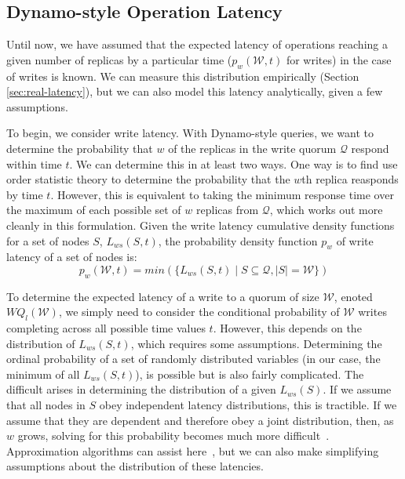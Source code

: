 \documentclass{vldb}
\begin{document}
\subsection{Dynamo-style Operation Latency}

\label{sec:dynamo-prop}

Until now, we have assumed that the expected latency of operations
reaching a given number of replicas by a particular time
($p_w(\mathcal{W}, t)$ for writes) in the case of writes is known.  We
can measure this distribution empirically (Section
\ref{sec:real-latency}), but we can also model this latency
analytically, given a few assumptions.

To begin, we consider write latency.  With Dynamo-style queries, we
want to determine the probability that $w$ of the replicas in the
write quorum $\mathcal{Q}$ respond within time $t$.  We can determine
this in at least two ways.  One way is to find use order statistic
theory to determine the probability that the $w$th replica reasponds
by time $t$.  However, this is equivalent to taking the minimum
response time over the maximum of each possible set of $w$ replicas
from $\mathcal{Q}$, which works out more cleanly in this formulation.
Given the write latency cumulative density functions for a set of
nodes $S$, $L_{ws}(S, t)$, the probability density function $p_w$ of
write latency of a set of nodes is:
\begin{equation}
p_w(\mathcal{W}, t) = min(\{L_{ws}(S, t) \mid S \subseteq \mathcal{Q}, |S| = \mathcal{W}\})
\end{equation}

To determine the expected latency of a write to a quorum of size
$\mathcal{W}$, enoted $WQ_l(\mathcal{W})$, we simply need to consider
the conditional probability of $\mathcal{W}$ writes completing across
all possible time values $t$.  However, this depends on the
distribution of $L_{ws}(S, t)$, which requires some
assumptions. Determining the ordinal probability of a set of randomly
distributed variables (in our case, the minimum of all $L_{ws}(S,
t)$), is possible but is also fairly complicated.  The difficult
arises in determining the distribution of a given $L_{ws}(S)$.  If we
assume that all nodes in $S$ obey independent latency distributions,
this is tractible.  If we assume that they are dependent and therefore
obey a joint distribution, then, as $w$ grows, solving for this
probability becomes much more difficult~\cite{needed}.  Approximation
algorithms can assist here~\cite{needed}, but we can also make
simplifying assumptions about the distribution of these latencies.
\end{document}

